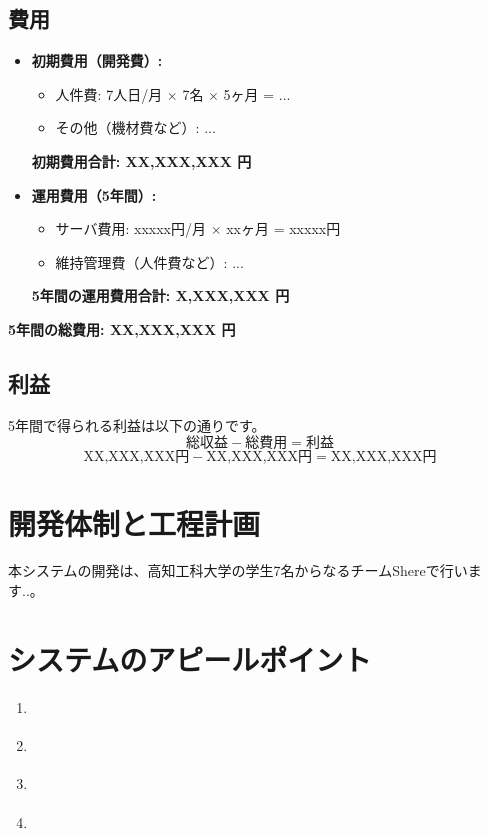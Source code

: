 \documentclass{docs}
\begin{document}
\subsection{費用}
\begin{itemize}
    \item \textbf{初期費用（開発費）:}
        \begin{itemize}
            \item 人件費: 7人日/月 $\times$ 7名 $\times$ 5ヶ月 = ...
            \item その他（機材費など）: ...
        \end{itemize}
        \textbf{初期費用合計: XX,XXX,XXX 円}
    \item \textbf{運用費用（5年間）:}
        \begin{itemize}
            \item サーバ費用: xxxxx円/月 $\times$ xxヶ月 = xxxxx円
            \item 維持管理費（人件費など）: ...
        \end{itemize}
        \textbf{5年間の運用費用合計: X,XXX,XXX 円}
\end{itemize}
\textbf{5年間の総費用: XX,XXX,XXX 円}

\subsection{利益}
5年間で得られる利益は以下の通りです。
$$
\text{総収益} - \text{総費用} = \text{利益}
$$
$$
\text{XX,XXX,XXX円} - \text{XX,XXX,XXX円} = \text{XX,XXX,XXX円}
$$

\section{開発体制と工程計画}

本システムの開発は、高知工科大学の学生7名からなるチームShereで行います..。



\section{システムのアピールポイント}
\begin{enumerate}
    \item \textbf{}
    \item \textbf{}
    \item \textbf{}
    \item \textbf{}
\end{enumerate}
\end{document}
